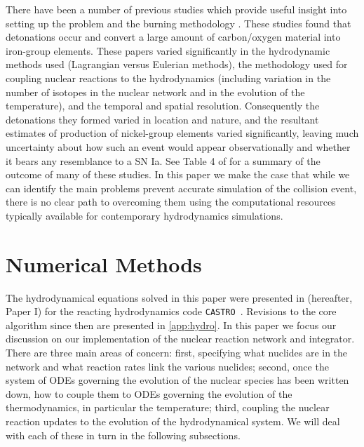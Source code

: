 \documentclass[twocolumn,numberedappendix]{../aastex6}
\newcommand{\castro}{\texttt{CASTRO}}
\begin{document}
There have been a number of previous studies which provide useful insight into setting up
the problem and the burning methodology \citep{rosswog:2009,raskin:2010,loren-aguilar:2010,
hawley:2012,garcia-senz:2013,kushnir:2013,papish:2015,holcomb:2015}. These studies
found that detonations occur and convert a large amount of carbon/oxygen material into
iron-group elements. These papers varied significantly in the hydrodynamic methods used
(Lagrangian versus Eulerian methods), the methodology used for coupling nuclear
reactions to the hydrodynamics (including variation in the number of isotopes in
the nuclear network and in the evolution of the temperature), and the temporal and
spatial resolution. Consequently the detonations they formed varied in location and nature,
and the resultant estimates of production of nickel-group elements varied significantly,
leaving much uncertainty about how such an event would appear observationally and whether
it bears any resemblance to a SN Ia. See Table 4 of \cite{garcia-senz:2013} for a summary
of the outcome of many of these studies. In this paper we make the case that
while we can identify the main problems prevent accurate simulation of the collision
event, there is no clear path to overcoming them using the computational resources
typically available for contemporary hydrodynamics simulations.

\section{Numerical Methods}
\label{sec:numericalmethods}

The hydrodynamical equations solved in this paper were presented in \citet{wdmergerI}
(hereafter, Paper I) for the reacting hydrodynamics code \castro\ \citep{castro}.
Revisions to the core algorithm since then are presented in \autoref{app:hydro}.
In this paper we focus our discussion on our implementation of the nuclear
reaction network and integrator. There are three main areas of concern: first,
specifying what nuclides are in the network and what reaction rates link the
various nuclides; second, once the system of ODEs governing the evolution of
the nuclear species has been written down, how to couple them to ODEs governing
the evolution of the thermodynamics, in particular the temperature; third,
coupling the nuclear reaction updates to the evolution of the hydrodynamical
system. We will deal with each of these in turn in the following subsections.
\end{document}

